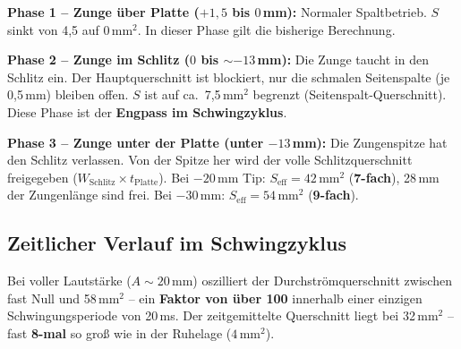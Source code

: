 \documentclass[11pt,a4paper]{article}
\begin{document}
\textbf{Phase 1 -- Zunge über Platte ($+1{,}5$ bis $0$\,mm):} Normaler Spaltbetrieb. $S$ sinkt von 4{,}5 auf 0\,mm$^2$. In dieser Phase gilt die bisherige Berechnung.

\textbf{Phase 2 -- Zunge im Schlitz ($0$ bis $\sim$$-13$\,mm):} Die Zunge taucht in den Schlitz ein. Der Hauptquerschnitt ist blockiert, nur die schmalen Seitenspalte (je 0{,}5\,mm) bleiben offen. $S$ ist auf ca.\ 7{,}5\,mm$^2$ begrenzt (Seitenspalt-Querschnitt). Diese Phase ist der \textbf{Engpass im Schwingzyklus}.

\textbf{Phase 3 -- Zunge unter der Platte (unter $-13$\,mm):} Die Zungenspitze hat den Schlitz verlassen. Von der Spitze her wird der volle Schlitzquerschnitt freigegeben ($W_\text{Schlitz} \times t_\text{Platte}$). Bei $-20$\,mm Tip: $S_\text{eff} = 42$\,mm$^2$ (\textbf{7-fach}), 28\,mm der Zungenlänge sind frei. Bei $-30$\,mm: $S_\text{eff} = 54$\,mm$^2$ (\textbf{9-fach}).

\subsection{Zeitlicher Verlauf im Schwingzyklus}

\begin{table}[H]
\centering\small
{}
\caption{Zeitgemittelte Spaltfläche über einen Schwingzyklus (alle $S$ in mm$^2$)}
\end{table}

\begin{warnbox}
Bei voller Lautstärke ($A \sim 20$\,mm) oszilliert der Durchströmquerschnitt zwischen fast Null und 58\,mm$^2$ -- ein \textbf{Faktor von über 100} innerhalb einer einzigen Schwingungsperiode von 20\,ms. Der zeitgemittelte Querschnitt liegt bei 32\,mm$^2$ -- fast \textbf{8-mal} so groß wie in der Ruhelage ($4$\,mm$^2$).
\end{warnbox}
\end{document}
